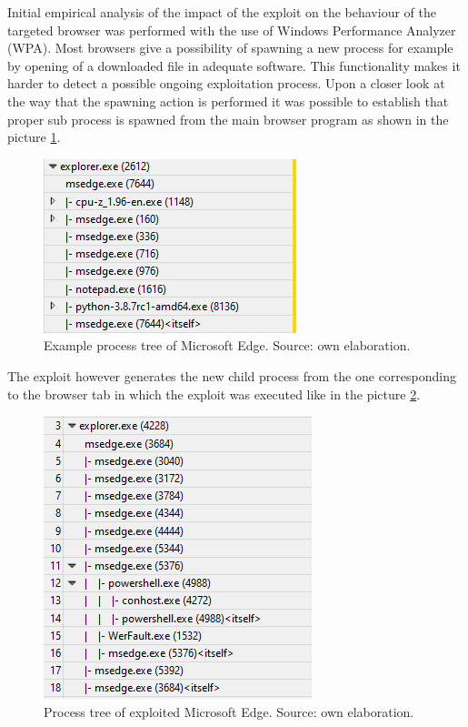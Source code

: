\documentclass[a4paper,twoside,12pt]{book}
\begin{document}
Initial empirical analysis of the impact of the exploit on the behaviour of the targeted browser was 
performed with the use of Windows Performance Analyzer (WPA).  Most browsers give a 
possibility of spawning a new process for example by opening of a downloaded file in 
adequate software. This functionality makes it harder to detect a possible ongoing exploitation process. 
Upon a closer look at the way that the spawning action is performed it was possible to establish that proper 
sub process is spawned from the main browser program as shown in the picture \ref{fig:WPAnormal}.

\begin{figure}
	\centering
	\includegraphics{images/wpa_normal}
	\caption{Example process tree of Microsoft Edge. Source: own elaboration.}
	\label{fig:WPAnormal}
 \end{figure}

The exploit however generates the new child process from the one corresponding to the browser tab 
in which the exploit was executed like in the picture \ref{fig:WPAexploit}. 

\begin{figure}
	\centering
	\includegraphics{images/wpa_exploit}
	\caption{Process tree of exploited Microsoft Edge. Source: own elaboration.}
	\label{fig:WPAexploit}
 \end{figure}
\end{document}
